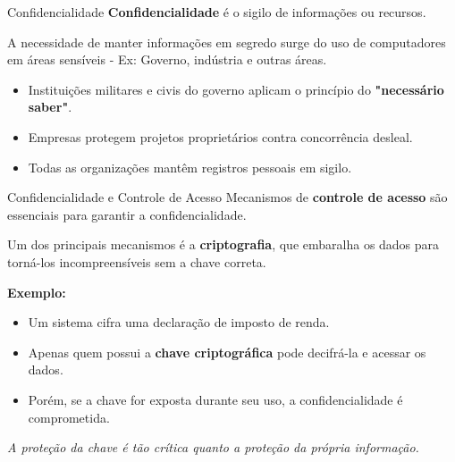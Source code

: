 \begin{frame}{Confidencialidade}
    \textbf{Confidencialidade} é o sigilo de informações ou recursos.

    \vspace{0.4cm}
    A necessidade de manter informações em segredo surge do uso de computadores em áreas sensíveis - Ex: Governo, indústria e outras áreas.

    \vspace{0.4cm}
    \begin{itemize}
        \item Instituições militares e civis do governo aplicam o princípio do \textbf{"necessário saber"}.
        \item Empresas protegem projetos proprietários contra concorrência desleal.
        \item Todas as organizações mantêm registros pessoais em sigilo.
    \end{itemize}
\end{frame}

\begin{frame}{Confidencialidade e Controle de Acesso}
    Mecanismos de \textbf{controle de acesso} são essenciais para garantir a confidencialidade.

    \vspace{0.3cm}
    Um dos principais mecanismos é a \textbf{criptografia}, que embaralha os dados para torná-los incompreensíveis sem a chave correta.

    \vspace{0.3cm}
    \textbf{Exemplo:} 
    \begin{itemize}
        \item Um sistema cifra uma declaração de imposto de renda.
        \item Apenas quem possui a \textbf{chave criptográfica} pode decifrá-la e acessar os dados.
        \item Porém, se a chave for exposta durante seu uso, a confidencialidade é comprometida.
    \end{itemize}

    \vspace{0.2cm}
    \textit{A proteção da chave é tão crítica quanto a proteção da própria informação.}
\end{frame}

